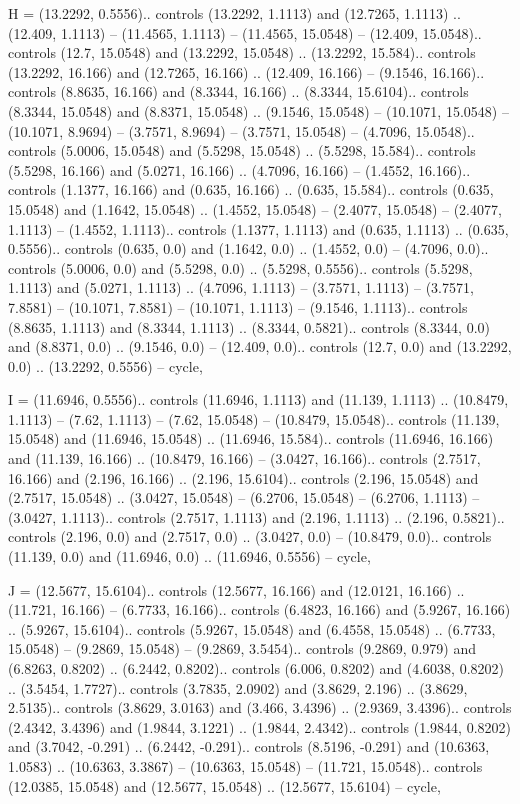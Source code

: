 H = {(13.2292, 0.5556).. controls (13.2292, 1.1113) and (12.7265, 1.1113) .. (12.409, 1.1113) -- (11.4565, 1.1113) -- (11.4565, 15.0548) -- (12.409, 15.0548).. controls (12.7, 15.0548) and (13.2292, 15.0548) .. (13.2292, 15.584).. controls (13.2292, 16.166) and (12.7265, 16.166) .. (12.409, 16.166) -- (9.1546, 16.166).. controls (8.8635, 16.166) and (8.3344, 16.166) .. (8.3344, 15.6104).. controls (8.3344, 15.0548) and (8.8371, 15.0548) .. (9.1546, 15.0548) -- (10.1071, 15.0548) -- (10.1071, 8.9694) -- (3.7571, 8.9694) -- (3.7571, 15.0548) -- (4.7096, 15.0548).. controls (5.0006, 15.0548) and (5.5298, 15.0548) .. (5.5298, 15.584).. controls (5.5298, 16.166) and (5.0271, 16.166) .. (4.7096, 16.166) -- (1.4552, 16.166).. controls (1.1377, 16.166) and (0.635, 16.166) .. (0.635, 15.584).. controls (0.635, 15.0548) and (1.1642, 15.0548) .. (1.4552, 15.0548) -- (2.4077, 15.0548) -- (2.4077, 1.1113) -- (1.4552, 1.1113).. controls (1.1377, 1.1113) and (0.635, 1.1113) .. (0.635, 0.5556).. controls (0.635, 0.0) and (1.1642, 0.0) .. (1.4552, 0.0) -- (4.7096, 0.0).. controls (5.0006, 0.0) and (5.5298, 0.0) .. (5.5298, 0.5556).. controls (5.5298, 1.1113) and (5.0271, 1.1113) .. (4.7096, 1.1113) -- (3.7571, 1.1113) -- (3.7571, 7.8581) -- (10.1071, 7.8581) -- (10.1071, 1.1113) -- (9.1546, 1.1113).. controls (8.8635, 1.1113) and (8.3344, 1.1113) .. (8.3344, 0.5821).. controls (8.3344, 0.0) and (8.8371, 0.0) .. (9.1546, 0.0) -- (12.409, 0.0).. controls (12.7, 0.0) and (13.2292, 0.0) .. (13.2292, 0.5556) -- cycle},

I = {(11.6946, 0.5556).. controls (11.6946, 1.1113) and (11.139, 1.1113) .. (10.8479, 1.1113) -- (7.62, 1.1113) -- (7.62, 15.0548) -- (10.8479, 15.0548).. controls (11.139, 15.0548) and (11.6946, 15.0548) .. (11.6946, 15.584).. controls (11.6946, 16.166) and (11.139, 16.166) .. (10.8479, 16.166) -- (3.0427, 16.166).. controls (2.7517, 16.166) and (2.196, 16.166) .. (2.196, 15.6104).. controls (2.196, 15.0548) and (2.7517, 15.0548) .. (3.0427, 15.0548) -- (6.2706, 15.0548) -- (6.2706, 1.1113) -- (3.0427, 1.1113).. controls (2.7517, 1.1113) and (2.196, 1.1113) .. (2.196, 0.5821).. controls (2.196, 0.0) and (2.7517, 0.0) .. (3.0427, 0.0) -- (10.8479, 0.0).. controls (11.139, 0.0) and (11.6946, 0.0) .. (11.6946, 0.5556) -- cycle},

J = {(12.5677, 15.6104).. controls (12.5677, 16.166) and (12.0121, 16.166) .. (11.721, 16.166) -- (6.7733, 16.166).. controls (6.4823, 16.166) and (5.9267, 16.166) .. (5.9267, 15.6104).. controls (5.9267, 15.0548) and (6.4558, 15.0548) .. (6.7733, 15.0548) -- (9.2869, 15.0548) -- (9.2869, 3.5454).. controls (9.2869, 0.979) and (6.8263, 0.8202) .. (6.2442, 0.8202).. controls (6.006, 0.8202) and (4.6038, 0.8202) .. (3.5454, 1.7727).. controls (3.7835, 2.0902) and (3.8629, 2.196) .. (3.8629, 2.5135).. controls (3.8629, 3.0163) and (3.466, 3.4396) .. (2.9369, 3.4396).. controls (2.4342, 3.4396) and (1.9844, 3.1221) .. (1.9844, 2.4342).. controls (1.9844, 0.8202) and (3.7042, -0.291) .. (6.2442, -0.291).. controls (8.5196, -0.291) and (10.6363, 1.0583) .. (10.6363, 3.3867) -- (10.6363, 15.0548) -- (11.721, 15.0548).. controls (12.0385, 15.0548) and (12.5677, 15.0548) .. (12.5677, 15.6104) -- cycle},

